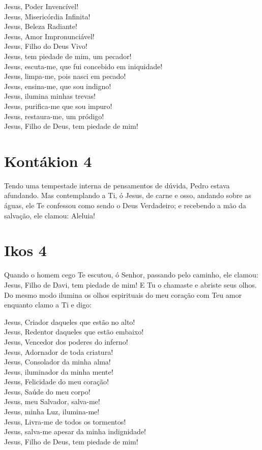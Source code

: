\documentclass{subfiles}
\begin{document}
Jesus, Poder Invencível! \\
Jesus, Misericórdia Infinita! \\
Jesus, Beleza Radiante! \\
Jesus, Amor Impronunciável! \\
Jesus, Filho do Deus Vivo! \\
Jesus, tem piedade de mim, um pecador! \\
Jesus, escuta-me, que fui concebido em iniquidade! \\
Jesus, limpa-me, pois nasci em pecado! \\
Jesus, ensina-me, que sou indigno! \\
Jesus, ilumina minhas trevas! \\
Jesus, purifica-me que sou impuro! \\
Jesus, restaura-me, um pródigo! \\
Jesus, Filho de Deus, tem piedade de mim!

\section{Kontákion 4}

Tendo uma tempestade interna de pensamentos de dúvida, Pedro
estava afundando. Mas contemplando a Ti, ó Jesus, de carne e osso, andando
sobre as águas, ele Te confessou como sendo o Deus Verdadeiro; e recebendo
a mão da salvação, ele clamou: Aleluia!

\section{Ikos 4}

Quando o homem cego Te escutou, ó Senhor, passando pelo caminho,
ele clamou: Jesus, Filho de Davi, tem piedade de mim! E Tu o chamaste e
abriste seus olhos. Do mesmo modo ilumina os olhos espirituais do meu
coração com Teu amor enquanto clamo a Ti e digo:

Jesus, Criador daqueles que estão no alto! \\
Jesus, Redentor daqueles que estão embaixo! \\
Jesus, Vencedor dos poderes do inferno! \\
Jesus, Adornador de toda criatura! \\
Jesus, Consolador da minha alma! \\
Jesus, iluminador da minha mente! \\
Jesus, Felicidade do meu coração! \\
Jesus, Saúde do meu corpo! \\
Jesus, meu Salvador, salva-me! \\
Jesus, minha Luz, ilumina-me! \\
Jesus, Livra-me de todos os tormentos! \\
Jesus, salva-me apesar da minha indignidade! \\
Jesus, Filho de Deus, tem piedade de mim!
\end{document}
